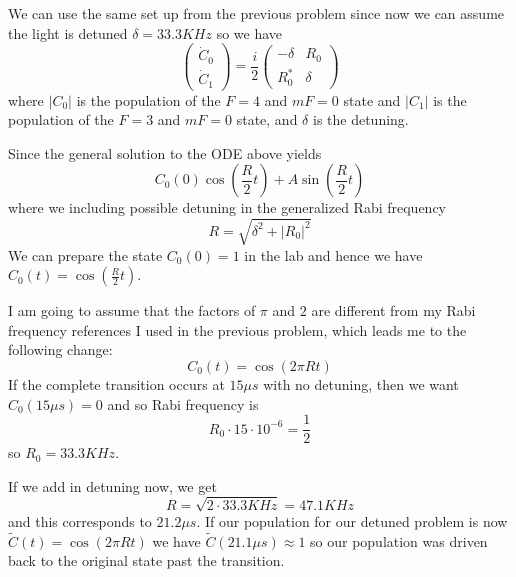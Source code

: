 \documentclass[12pt]{article} %
\begin{document}
\begin{solution}
We can use the same set up from the previous problem since now we can assume the light is detuned $\delta = 33.3\si{KHz}$ so we have
\begin{equation}
\begin{pmatrix} 
	\dot{C}_0\\ \dot{C}_1
\end{pmatrix} 
= 
\frac{i}{2} \begin{pmatrix} -\delta & R_0 \\
		R_0^*  & \delta \end{pmatrix}
\end{equation}
where $|C_0|$ is the population of the $F=4$ and $mF=0$ state and $|C_1|$ is the population of the $F=3$ and $mF=0$ state, and $\delta$ is the detuning. 

Since the general solution to the ODE above yields
\begin{equation}
	C_0(0)\cos \left( \frac{R}{2}t\right) + A \sin\left(\frac{R}{2} t\right)
\end{equation} 
where we including possible detuning in the generalized Rabi frequency
\begin{equation}
	R = \sqrt{\delta^2 + |R_0|^2}
\end{equation}
We can prepare the state $C_0(0)=1$ in the lab and hence we have $C_0(t) =\cos \left( \frac{R}{2}t\right)$.

I am going to assume that the factors of $\pi$ and $2$ are different from my Rabi frequency references I used in the previous problem, which leads me to the following change:
\begin{equation}
C_0(t) =\cos \left( 2\pi R t\right)
\end{equation}
If the complete transition occurs at $15 \si{\mu s}$ with no detuning, then we want $C_0(15 \si{\mu s})=0$ and so Rabi frequency is
\begin{equation}
	R_0 \cdot 15\cdot 10^{-6} = \frac{1}{2}
\end{equation}
so $R_0 = 33.3\si{KHz}$. 

If we add in detuning now, we get
\begin{equation}
	R = \sqrt{2\cdot 33.3\si{KHz}} = 47.1\si{KHz}
\end{equation}
and this corresponds to $21.2 \si{\mu s}$. If our population for our detuned problem is now $\tilde{C}(t)=\cos \left( 2\pi R t\right)$ we have $\tilde{C}(21.1\si{\mu s}) \approx 1$ so our population was driven back to the original state past the transition.
\end{solution}
\end{document}
